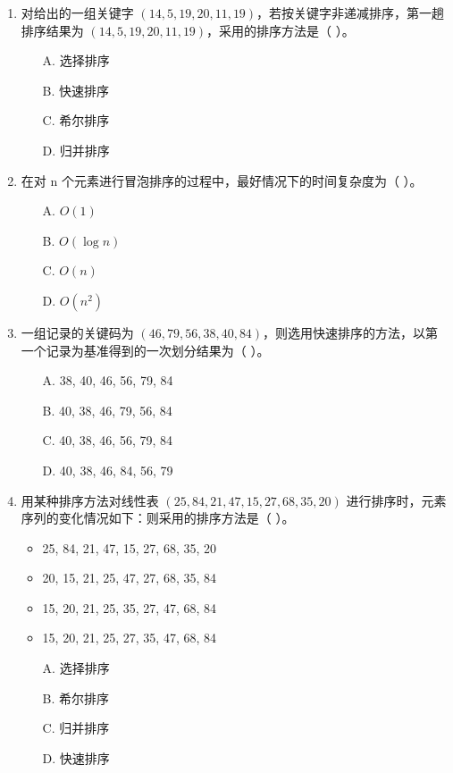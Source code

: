 \documentclass[12pt, a4paper]{article}
\begin{document}
\begin{enumerate}
    \item 对给出的一组关键字 $(14, 5, 19, 20, 11, 19)$，若按关键字非递减排序，第一趟排序结果为 $(14, 5, 19, 20, 11, 19)$，采用的排序方法是（ ）。
    \begin{enumerate}
        \item[A.] 选择排序
        \item[B.] 快速排序
        \item[C.] 希尔排序
        \item[D.] 归并排序
    \end{enumerate}
    
    \item 在对 n 个元素进行冒泡排序的过程中，最好情况下的时间复杂度为（ ）。
    \begin{enumerate}
        \item[A.] $O(1)$
        \item[B.] $O(\log n)$
        \item[C.] $O(n)$
        \item[D.] $O(n^2)$
    \end{enumerate}
    
    \item 一组记录的关键码为 $(46, 79, 56, 38, 40, 84)$，则选用快速排序的方法，以第一个记录为基准得到的一次划分结果为（ ）。
    \begin{enumerate}
        \item[A.] 38, 40, 46, 56, 79, 84
        \item[B.] 40, 38, 46, 79, 56, 84
        \item[C.] 40, 38, 46, 56, 79, 84
        \item[D.] 40, 38, 46, 84, 56, 79
    \end{enumerate}
    
    \item 用某种排序方法对线性表 $(25, 84, 21, 47, 15, 27, 68, 35, 20)$ 进行排序时，元素序列的变化情况如下：则采用的排序方法是（ ）。
    \begin{itemize}
        \item 25, 84, 21, 47, 15, 27, 68, 35, 20
        \item 20, 15, 21, 25, 47, 27, 68, 35, 84
        \item 15, 20, 21, 25, 35, 27, 47, 68, 84
        \item 15, 20, 21, 25, 27, 35, 47, 68, 84
    \end{itemize}
    \begin{enumerate}
        \item[A.] 选择排序
        \item[B.] 希尔排序
        \item[C.] 归并排序
        \item[D.] 快速排序
    \end{enumerate}
    

\end{enumerate}
\end{document}
